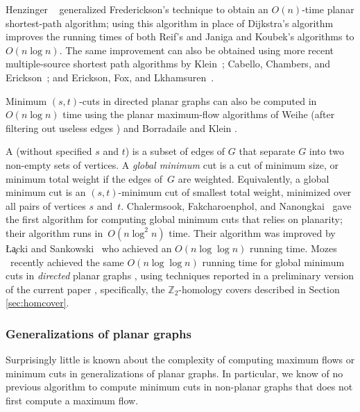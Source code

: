 \documentclass[letterpaper,review]{siamart190516}
\def\Z{\mathbb{Z}}
\begin{document}
Henzinger \etal~\cite{hkrs-fspap-97} generalized Frederickson's technique to obtain an $O(n)$-time
planar shortest-path algorithm; using this algorithm in place of Dijkstra's algorithm improves the
running times of both Reif's and Janiga and Koubek's algorithms to $O(n\log n)$.  The same
improvement can also be obtained using more recent multiple-source shortest path algorithms by
Klein~\cite{k-msspp-05}; Cabello, Chambers, and Erickson~\cite{cce-msspe-13}; and Erickson, Fox, and
Lkhamsuren~\cite{efl-hmcpf-18}.

Minimum $(s,t)$-cuts in directed planar graphs can also be computed in $O(n\log n)$ time using the planar maximum-flow algorithms of Weihe \cite{w-mstfp-97} (after filtering out useless edges \cite{fls-fuadp-18}) and Borradaile and Klein \cite{b-epnfc-08, bk-tamfd-06, bk-amfdp-09}.

A  (without specified $s$ and $t$) is a subset of edges of $G$ that separate $G$ into two non-empty sets of vertices.
A \emph{global minimum} cut is a cut of minimum size, or minimum total weight if the edges of~$G$
are weighted.  Equivalently, a global minimum cut is an $(s,t)$-minimum cut of smallest total
weight, minimized over all pairs of vertices $s$ and~$t$.  Chalermsook, Fakcharoenphol, and
Nanongkai~\cite{cfn-dnlta-04} gave the first algorithm for computing global minimum cuts that relies
on planarity; their algorithm runs in~$O(n \log^2 n)$ time.  Their algorithm was improved by
\L\c{a}cki and Sankowski~\cite{ls-mcsc-11} who achieved an $O(n \log \log n)$ running time.  Mozes
\etal~recently achieved the same $O(n \log \log n)$ running time for global minimum cuts in
\emph{directed} planar graphs \cite{mnnw-mdpgo-18},  using techniques reported in a preliminary
version of the current paper \cite{en-mcsnc-11}, specifically, the $\Z_2$-homology covers described in Section \ref{sec:homcover}.

\subsubsection*{Generalizations of planar graphs}

Surprisingly little is known about the complexity of computing maximum flows or minimum cuts in generalizations of planar graphs.  In particular, we know of no previous algorithm to compute minimum cuts in non-planar graphs that does not first compute a maximum flow.
\end{document}
